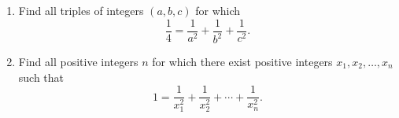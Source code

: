 \begin{enumerate}[label = (\alph*)]
	\item Find all triples of integers $(a, b, c)$ for which \[\frac{1}{4} = \frac{1}{a^2} + \frac{1}{b^2} + \frac{1}{c^2}.\]
	\item Find all positive integers $n$ for which there exist positive integers $x_1, x_2, \dots, x_n$ such that \[ 1 = \frac{1}{x_1^2} + \frac{1}{x_2^2} + \cdots + \frac{1}{x_n^2}. \]
\end{enumerate}
